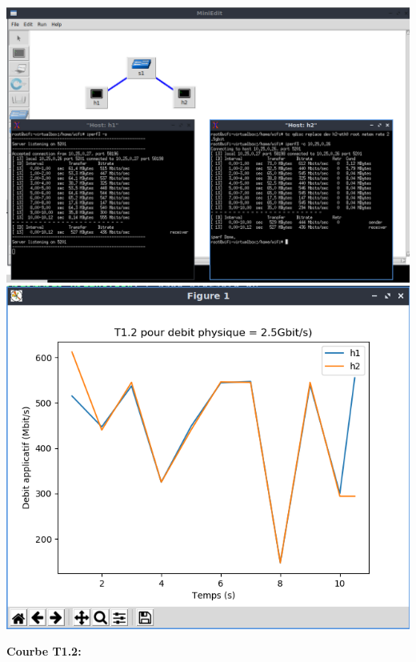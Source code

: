 \begin{center}
    \includegraphics[width=1\textwidth]{./images/T1.2/2500test2.png}
    \includegraphics[width=1\textwidth]{./images/T1.2/courbe2500test2.png}
\end{center}

\newpage
\textbf{Courbe T1.2:} 




